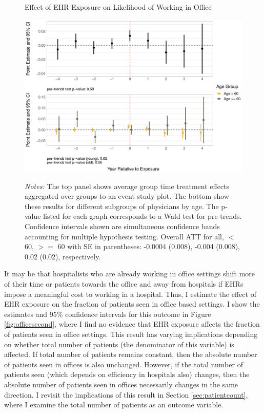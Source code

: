 \documentclass[12pt]{article}
\begin{document}
\begin{figure}[ht]
    \centering
    \captionsetup{width=.85\linewidth}
    \caption{Effect of EHR Exposure on Likelihood of Working in Office}
    \includegraphics[scale=.6]{Objects/officeind_plot.pdf}
    \label{fig:officefirst}
    \vspace{2mm}
    \caption*{\footnotesize{\textit{Notes:} The top panel shows average group time treatment effects aggregated over groups to an event study plot. The bottom show these results for different subgroups of physicians by age. The p-value listed for each graph corresponds to a Wald test for pre-trends. Confidence intervals shown are simultaneous confidence bands accounting for multiple hypothesis testing. Overall ATT for all, $<$ 60, $>=$ 60 with SE in parentheses: -0.0004 (0.008), -0.004 (0.008), 0.02 (0.02), respectively.}}
\end{figure}

It may be that hospitalists who are already working in office settings shift more of their time or patients towards the office and away from hospitals if EHRs impose a meaningful cost to working in a hospital. Thus, I estimate the effect of EHR exposure on the fraction of patients seen in office based settings. I show the estimates and 95\% confidence intervals for this outcome in Figure \ref{fig:officesecond}, where I find no evidence that EHR exposure affects the fraction of patients seen in office settings. This result has varying implications depending on whether total number of patients (the denominator of this variable) is affected. If total number of patients remains constant, then the absolute number of patients seen in offices is also unchanged. However, if the total number of patients seen (which depends on efficiency in hospitals also) changes, then the absolute number of patients seen in offices necessarily changes in the same direction. I revisit the implications of this result in Section \ref{sec:patientcount}, where I examine the total number of patients as an outcome variable.
\end{document}
